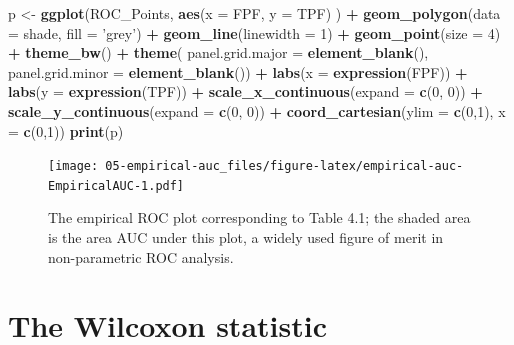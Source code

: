 \documentclass[
]{book}
\newenvironment{Shaded}{\begin{snugshade}}{\end{snugshade}}
\newcommand{\DataTypeTok}[1]{\textcolor[rgb]{0.13,0.29,0.53}{#1}}
\newcommand{\DecValTok}[1]{\textcolor[rgb]{0.00,0.00,0.81}{#1}}
\newcommand{\KeywordTok}[1]{\textcolor[rgb]{0.13,0.29,0.53}{\textbf{#1}}}
\newcommand{\NormalTok}[1]{#1}
\newcommand{\OperatorTok}[1]{\textcolor[rgb]{0.81,0.36,0.00}{\textbf{#1}}}
\newcommand{\StringTok}[1]{\textcolor[rgb]{0.31,0.60,0.02}{#1}}
\begin{document}
\begin{Shaded}
\begin{Highlighting}[]
\NormalTok{p <-}\StringTok{ }\KeywordTok{ggplot}\NormalTok{(ROC_Points, }
            \KeywordTok{aes}\NormalTok{(}\DataTypeTok{x =}\NormalTok{ FPF, }\DataTypeTok{y =}\NormalTok{ TPF) ) }\OperatorTok{+}\StringTok{ }
\StringTok{  }\KeywordTok{geom_polygon}\NormalTok{(}\DataTypeTok{data =}\NormalTok{ shade, }\DataTypeTok{fill =} \StringTok{'grey'}\NormalTok{) }\OperatorTok{+}\StringTok{ }
\StringTok{  }\KeywordTok{geom_line}\NormalTok{(}\DataTypeTok{linewidth =} \DecValTok{1}\NormalTok{) }\OperatorTok{+}\StringTok{ }
\StringTok{  }\KeywordTok{geom_point}\NormalTok{(}\DataTypeTok{size =} \DecValTok{4}\NormalTok{) }\OperatorTok{+}\StringTok{ }
\StringTok{  }\KeywordTok{theme_bw}\NormalTok{() }\OperatorTok{+}\StringTok{ }
\StringTok{  }\KeywordTok{theme}\NormalTok{(}
    \DataTypeTok{panel.grid.major =} \KeywordTok{element_blank}\NormalTok{(), }
    \DataTypeTok{panel.grid.minor =} \KeywordTok{element_blank}\NormalTok{()) }\OperatorTok{+}
\StringTok{  }\KeywordTok{labs}\NormalTok{(}\DataTypeTok{x =} \KeywordTok{expression}\NormalTok{(FPF)) }\OperatorTok{+}\StringTok{ }
\StringTok{  }\KeywordTok{labs}\NormalTok{(}\DataTypeTok{y =} \KeywordTok{expression}\NormalTok{(TPF)) }\OperatorTok{+}\StringTok{ }
\StringTok{  }\KeywordTok{scale_x_continuous}\NormalTok{(}\DataTypeTok{expand =} \KeywordTok{c}\NormalTok{(}\DecValTok{0}\NormalTok{, }\DecValTok{0}\NormalTok{)) }\OperatorTok{+}\StringTok{ }
\StringTok{  }\KeywordTok{scale_y_continuous}\NormalTok{(}\DataTypeTok{expand =} \KeywordTok{c}\NormalTok{(}\DecValTok{0}\NormalTok{, }\DecValTok{0}\NormalTok{)) }\OperatorTok{+}\StringTok{ }
\StringTok{  }\KeywordTok{coord_cartesian}\NormalTok{(}\DataTypeTok{ylim =} \KeywordTok{c}\NormalTok{(}\DecValTok{0}\NormalTok{,}\DecValTok{1}\NormalTok{), }\DataTypeTok{x =} \KeywordTok{c}\NormalTok{(}\DecValTok{0}\NormalTok{,}\DecValTok{1}\NormalTok{))}
\KeywordTok{print}\NormalTok{(p)}
\end{Highlighting}
\end{Shaded}

\begin{figure}
\centering
\texttt{[image: 05-empirical-auc\_files/figure-latex/empirical-auc-EmpiricalAUC-1.pdf]}
\caption{\label{fig:empirical-auc-EmpiricalAUC}The empirical ROC plot corresponding to Table 4.1; the shaded area is the area AUC under this plot, a widely used figure of merit in non-parametric ROC analysis.}
\end{figure}

\hypertarget{empirical-auc-wilcoxon}{%
\section{The Wilcoxon statistic}\label{empirical-auc-wilcoxon}}
\end{document}
